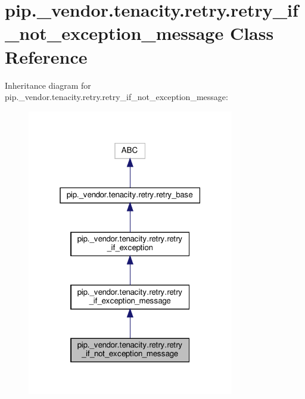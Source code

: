 \hypertarget{classpip_1_1__vendor_1_1tenacity_1_1retry_1_1retry__if__not__exception__message}{}\section{pip.\+\_\+vendor.\+tenacity.\+retry.\+retry\+\_\+if\+\_\+not\+\_\+exception\+\_\+message Class Reference}
\label{classpip_1_1__vendor_1_1tenacity_1_1retry_1_1retry__if__not__exception__message}


Inheritance diagram for pip.\+\_\+vendor.\+tenacity.\+retry.\+retry\+\_\+if\+\_\+not\+\_\+exception\+\_\+message\+:
\nopagebreak
\begin{figure}[H]
\begin{center}
\leavevmode
\includegraphics[width=256pt]{classpip_1_1__vendor_1_1tenacity_1_1retry_1_1retry__if__not__exception__message__inherit__graph}
\end{center}
\end{figure}


